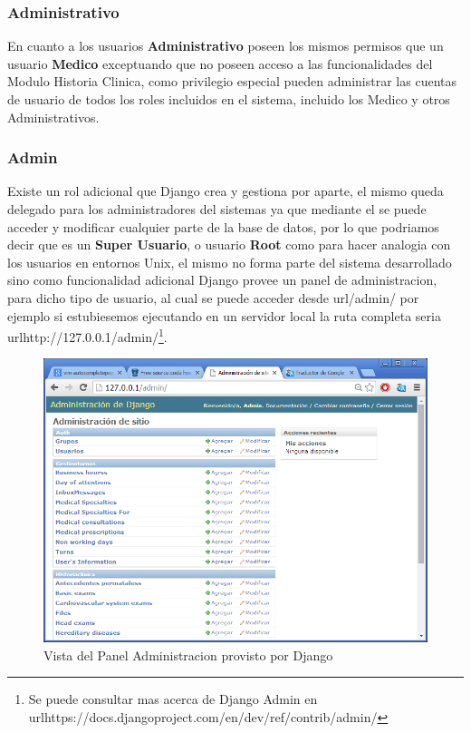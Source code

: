 \subsubsection{Administrativo}

En cuanto a los usuarios \textbf{Administrativo} poseen los mismos permisos que 
un usuario \textbf{Medico} exceptuando que no poseen acceso a las funcionalidades 
del Modulo Historia Clinica, como privilegio especial pueden administrar las 
cuentas de usuario de todos los roles incluidos en el sistema, incluido los 
Medico y otros Administrativos.

\subsubsection{Admin}

Existe un rol adicional que Django crea y gestiona por aparte, el mismo queda 
delegado para los administradores del sistemas ya que mediante el se puede acceder
y modificar cualquier parte de la base de datos, por lo que podriamos decir que 
es un \textbf{Super Usuario}, o usuario \textbf{Root} como para hacer analogia
con los usuarios en entornos Unix, el mismo no forma parte del sistema desarrollado
sino como funcionalidad adicional Django provee un panel de administracion, 
para dicho tipo de usuario, al cual se puede acceder desde url{/admin/} por ejemplo
si estubiesemos ejecutando en un servidor local la ruta completa seria 
url{http://127.0.0.1/admin/}\footnote{Se puede consultar mas acerca de Django
Admin en url{https://docs.djangoproject.com/en/dev/ref/contrib/admin/}}.\\[0.1cm]


\begin{figure}[h]
    \centering
    \includegraphics[scale=1.5]{resourse/django-admin.png}
    \caption{Vista del Panel Administracion provisto por Django}
    \label{fig:123}
\end{figure}  



